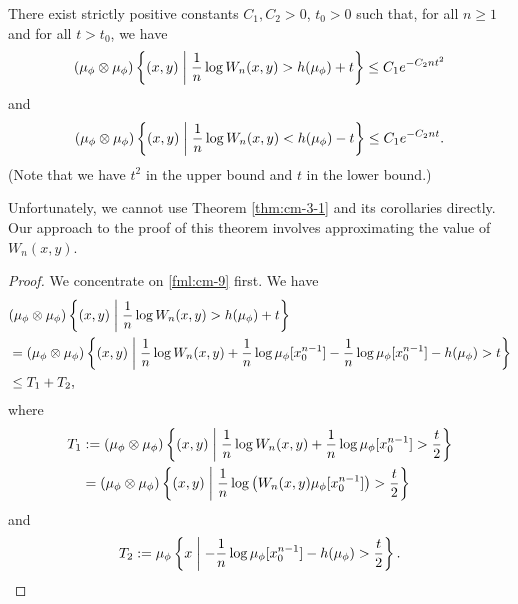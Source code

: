 \begin{theorem}
	There exist strictly positive constants $C_1, C_2 > 0$, $t_0 > 0$ such that, for all $n \geq 1$ and for all $t > t_0$, we have
	\begin{equation}
		(\mu_\phi \otimes \mu_\phi)\left\{(x, y) \mathrel{}\middle|\mathrel{} \frac{1}{n}\log{W_n(x, y)} > h(\mu_\phi) + t\right\} \leq C_1 e^{-C_2 nt^2} \label{fml:cm-9}
	\end{equation}
	and
	\begin{equation}
		(\mu_\phi \otimes \mu_\phi)\left\{(x, y) \mathrel{}\middle|\mathrel{} \frac{1}{n}\log{W_n(x, y)} < h(\mu_\phi) - t\right\} \leq C_1 e^{-C_2 nt}. \label{fml:cm-10}
	\end{equation}
	(Note that we have $t^2$ in the upper bound and $t$ in the lower bound.)
	
	Unfortunately, we cannot use Theorem \ref{thm:cm-3-1} and its corollaries directly. Our approach to the proof of this theorem involves approximating the value of $W_n(x, y)$.
	
	\begin{proof}
		We concentrate on \eqref{fml:cm-9} first. We have
		\begin{align*}
			&(\mu_\phi \otimes \mu_\phi)\left\{(x, y) \midmid \frac{1}{n}\log{W_n(x, y)} > h(\mu_\phi) + t\right\} \\
				&= (\mu_\phi \otimes \mu_\phi)\left\{(x, y) \midmid \frac{1}{n}\log{W_n(x, y)} + \frac{1}{n}\log{\mu_\phi[x_0^{n - 1}]} - \frac{1}{n}\log{\mu_\phi[x_0^{n - 1}]} - h(\mu_\phi) > t\right\} \\
				&\leq T_1 + T_2, %
		\end{align*}
		where
		\begin{align*}
			T_1 &:= (\mu_\phi \otimes \mu_\phi)\left\{(x, y) \mathrel{}\middle|\mathrel{} \frac{1}{n}\log{W_n(x, y)} + \frac{1}{n}\log{\mu_\phi[x_0^{n - 1}]} > \frac{t}{2}\right\} \\
				&= (\mu_\phi \otimes \mu_\phi)\left\{(x, y) \mathrel{}\middle|\mathrel{} \frac{1}{n}\log\left(W_n(x, y) \mu_\phi[x_0^{n - 1}]\right) > \frac{t}{2}\right\}
		\end{align*}
		and
		\[
			T_2 := \mu_\phi\left\{x \mathrel{}\middle|\mathrel{} - \frac{1}{n}\log{\mu_\phi[x_0^{n - 1}]} - h(\mu_\phi) > \frac{t}{2}\right\}.
		\]
		

\end{proof}
\end{theorem}
